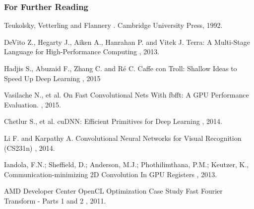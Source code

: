 \begin{frame}[allowframebreaks]
  \frametitle<presentation>{For Further Reading}
    
  \begin{thebibliography}{10}
    
  \beamertemplatebookbibitems

    Teukolsky, Vetterling and Flannery
    .
    \newblock Cambridge University Press, 1992.
 
    
  \beamertemplatearticlebibitems
    
    DeVito Z., Hegarty J., Aiken A., Hanrahan P. and Vitek J. 
    \newblock Terra: A Multi-Stage Language for High-Performance Computing 
    , 2013.
    
    Hadjis S.,  Abuzaid F., Zhang C. and R\'e C.
    \newblock Caffe con Troll: Shallow Ideas to Speed Up Deep Learning
     , 2015
    
    Vasilache N., et al. 
    \newblock On Fast Convolutional Nets With fbfft: A GPU Performance Evaluation.
    , 2015.
    
    Chetlur S., et al.
    \newblock cuDNN: Efficient Primitives for Deep Learning
    , 2014.
    
   Li F. and Karpathy A.
    \newblock Convolutional Neural Networks for Visual Recognition (CS231n)
    , 2014.
    
    Iandola, F.N.; Sheffield, D.; Anderson, M.J.; Phothilimthana, P.M.; Keutzer, K., 
    \newblock Communication-minimizing 2D Convolution In GPU Registers
    , 2013.
    
    AMD Developer Center
    \newblock OpenCL Optimization Case Study Fast Fourier Transform - Parts 1 and 2
    , 2011.
    
  \end{thebibliography}
\end{frame}



